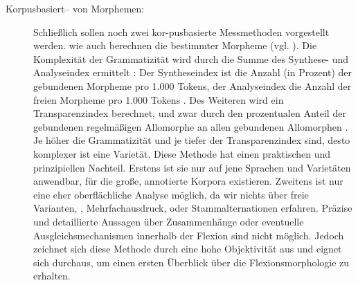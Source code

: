 \begin{exe}
\begin{exe}
\begin{description}
\item[Korpusbasiert-- von Morphemen:] Schließlich sollen noch zwei kor-\linebreak pusbasierte Messmethoden vorgestellt werden. \citet{SzmrecsanyiKortmann2009} wie auch \citet{MaitzNémeth2014} berechnen die  bestimmter Morpheme (vgl. ). Die Komplexität der Grammatizität wird durch die Summe des Synthese- und Analyseindex ermittelt \citep[72]{SzmrecsanyiKortmann2009}: Der Syntheseindex ist die Anzahl (in Prozent) der gebundenen Morpheme pro 1.000 Tokens, der Analyseindex die Anzahl der freien Morpheme pro 1.000 Tokens \citep[72]{SzmrecsanyiKortmann2009}. Des Weiteren wird ein Transparenzindex berechnet, und zwar durch den prozentualen Anteil der gebundenen regelmäßigen Allomorphe an allen gebundenen Allomorphen \citep[74]{SzmrecsanyiKortmann2009}. Je höher die Grammatizität und je tiefer der Transparenzindex sind, desto komplexer ist eine Varietät. Diese Methode hat einen praktischen und prinzipiellen Nachteil. Erstens ist sie nur auf jene Sprachen und Varietäten anwendbar, für die große, annotierte Korpora existieren. Zweitens ist nur eine eher oberflächliche Analyse möglich, da wir nichts über freie Varianten, , Mehrfachausdruck,  oder Stammalternationen erfahren. Präzise und detaillierte Aussagen über Zusammenhänge oder eventuelle Ausgleichsmechanismen innerhalb der Flexion sind nicht möglich. Jedoch zeichnet sich diese Methode durch eine hohe Objektivität aus und eignet sich durchaus, um einen ersten Überblick über die Flexionsmorphologie zu erhalten.


\end{description}
\end{exe}
\end{exe}

